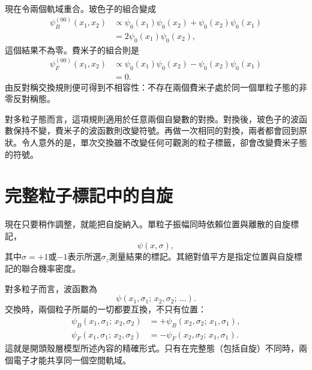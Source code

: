 現在令兩個軌域重合。玻色子的組合變成
\begin{align}
\psi_B^{(00)}(x_1,x_2)
&\propto
\psi_0(x_1)\psi_0(x_2)
+
\psi_0(x_2)\psi_0(x_1)\\
&=
2\psi_0(x_1)\psi_0(x_2),
\end{align}
這個結果不為零。費米子的組合則是
\begin{align}
\psi_F^{(00)}(x_1,x_2)
&\propto
\psi_0(x_1)\psi_0(x_2)
-
\psi_0(x_2)\psi_0(x_1)\\
&=0.
\end{align}
由反對稱交換規則便可得到不相容性：不存在兩個費米子處於同一個單粒子態的非零反對稱態。

對多粒子態而言，這項規則適用於任意兩個自變數的對換。對換後，玻色子的波函數保持不變，費米子的波函數則改變符號。再做一次相同的對換，兩者都會回到原狀。令人意外的是，單次交換雖不改變任何可觀測的粒子標籤，卻會改變費米子態的符號。

\section{完整粒子標記中的自旋}

現在只要稍作調整，就能把自旋納入。單粒子振幅同時依賴位置與離散的自旋標記，
\begin{equation}
\psi(x,\sigma),
\end{equation}
其中\(\sigma=+1\)或\(-1\)表示所選\(\sigma_z\)測量結果的標記。其絕對值平方是指定位置與自旋標記的聯合機率密度。

對多粒子而言，波函數為
\begin{equation}
\psi(x_1,\sigma_1;\,x_2,\sigma_2;\,\ldots).
\end{equation}
交換時，兩個粒子所屬的一切都要互換，不只有位置：
\begin{align}
\psi_B(x_1,\sigma_1;\,x_2,\sigma_2)
&=
+\psi_B(x_2,\sigma_2;\,x_1,\sigma_1),\\
\psi_F(x_1,\sigma_1;\,x_2,\sigma_2)
&=
-\psi_F(x_2,\sigma_2;\,x_1,\sigma_1).
\end{align}
這就是開頭殼層模型所述內容的精確形式。只有在完整態（包括自旋）不同時，兩個電子才能共享同一個空間軌域。

\begin{classroomqa}
\end{classroomqa}

\begin{classroomqa}
\end{classroomqa}

